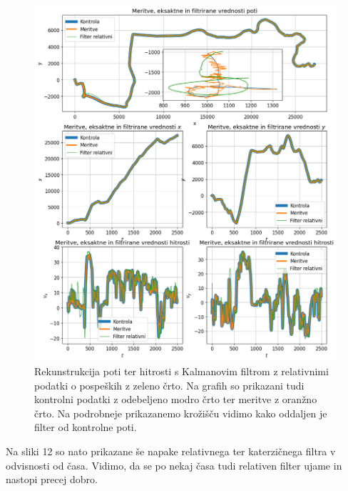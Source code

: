 \documentclass[slovene,11pt,a4paper]{article}
\begin{document}
\begin{figure}[h!]
\centering
\includegraphics[width=14cm]{slika11.png}
\caption{Rekunstrukcija poti ter hitrosti s Kalmanovim filtrom z relativnimi podatki o pospeških z zeleno črto. Na grafih so prikazani tudi kontrolni podatki z odebeljeno modro črto ter meritve z oranžno črto. Na podrobneje prikazanemo krožišču vidimo kako oddaljen je filter od kontrolne poti.}
\end{figure}

Na sliki 12 so nato prikazane še napake relativnega ter katerzičnega filtra v odvisnosti od časa. Vidimo, da se po nekaj časa tudi relativen filter ujame in nastopi precej dobro.
\end{document}
